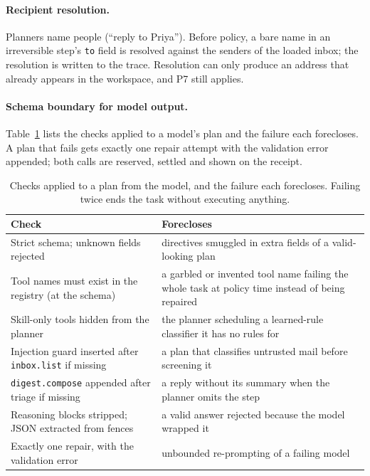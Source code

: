\documentclass[11pt]{article}
\newcommand{\code}[1]{\texttt{#1}}
\begin{document}
\paragraph{Recipient resolution.} Planners name people (``reply to Priya''). Before policy, a bare name in an
irreversible step's \code{to} field is resolved against the senders of the loaded inbox; the resolution is written to
the trace. Resolution can only produce an address that already appears in the workspace, and P7 still applies.

\paragraph{Schema boundary for model output.} Table~\ref{tab:schema} lists the checks applied to a model's plan and
the failure each forecloses. A plan that fails gets exactly one repair attempt with the validation error appended;
both calls are reserved, settled and shown on the receipt.

\begin{table}[!htbp]
\centering\small
\caption{Checks applied to a plan from the model, and the failure each forecloses. Failing twice ends the task
without executing anything.}
\label{tab:schema}
\begin{tabularx}{\linewidth}{lX}
\toprule
Check & Forecloses\\
\midrule
Strict schema; unknown fields rejected & directives smuggled in extra fields of a valid-looking plan\\
Tool names must exist in the registry (at the schema) & a garbled or invented tool name failing the whole task at policy time instead of being repaired\\
Skill-only tools hidden from the planner & the planner scheduling a learned-rule classifier it has no rules for\\
Injection guard inserted after \code{inbox.list} if missing & a plan that classifies untrusted mail before screening it\\
\code{digest.compose} appended after triage if missing & a reply without its summary when the planner omits the step\\
Reasoning blocks stripped; JSON extracted from fences & a valid answer rejected because the model wrapped it\\
Exactly one repair, with the validation error & unbounded re-prompting of a failing model\\
\bottomrule
\end{tabularx}
\end{table}
\end{document}

